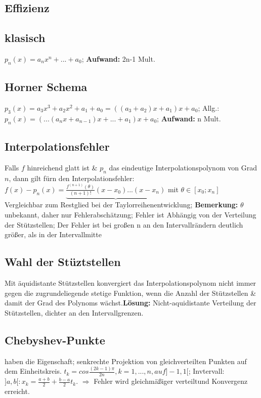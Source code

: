 \subsection{Effizienz}
\subsection{klasisch}
$ p_{n} (x) = a_{n} x^{n} + ... + a_{0} $; 
\textbf{Aufwand:} 2n-1 Mult.
\subsection{Horner Schema}
$ p_{3} (x) = a_{3} x^{3} + a_{2} x^{2} + a_{1} + a_{0} = (( a_{3} + a_{2} ) x + a_{1} )x+ a_{0} $; 
Allg.: $ p_{n} (x) = ( ... ( a_{n} x + a_{n-1} ) x + ... + a_{1} ) x + a_{0} $; 
\textbf{Aufwand:} n Mult.

\subsection{Interpolationsfehler}
Falls $ f $ hinreichend glatt ist \& $ p_{n} $ das eindeutige Interpolationspolynom von Grad $ n $, dann gilt fürn den Interpolationsfehler:
$ f(x) - p_{n}(x) = \underbrace{ \frac{ f^{ ( n+1 ) }( \theta ) }{ ( n+1) ! } ( x-x_{0} )...( x-x_{n} ) } $ mit $ \theta \in [ x_{0}; x_{n} ]  $\\
Vergleichbar zum Restglied bei der Taylorreihenentwicklung; 
\textbf{Bemerkung:} $ \theta $ unbekannt, daher nur Fehlerabschätzung; 
Fehler ist Abhängig von der Verteilung der Stützstellen; 
Der Fehler ist bei großen n an den Intervallrändern deutlich größer, als in der Intervallmitte
\subsection{Wahl der Stüztstellen}
Mit äquidistante Stützstellen konvergiert das Interpolationspolynom nicht immer gegen die zugrundeliegende stetige Funktion, wenn die Anzahl der Stützstellen \& damit der Grad des Polynoms wächst.\textbf{Lösung:}  Nicht-aquidistante Verteilung der Stützstellen, dichter an den Intervallgrenzen.
\subsection{Chebyshev-Punkte}
haben die Eigenschaft; senkrechte Projektion von gleichverteilten Punkten auf dem Einheitskreis. $ t_{k} = cos\frac{ ( 2k-1 ) \pi }{ 2n }, k=1,...,n, auf ]-1,1[ $;  Invtervall: $ ]a,b[: x_{k} = \frac{ a +b }{2} + \frac{ b-a }{ 2 } t_{k} $. $\Rightarrow$ Fehler wird gleichmäßiger verteiltund Konvergenz erreicht.
